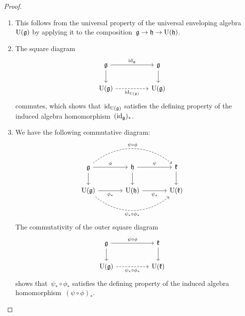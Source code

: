 \begin{proof}
  \leavevmode
  \begin{enumerate}
    \item
      This follows from the universal property of the universal enveloping algebra~$\operatorname{U}(\mathfrak{g})$ by applying it to the composition~$\mathfrak{g} \to \mathfrak{h} \to \operatorname{U}(\mathfrak{h})$.
    \item
      The square diagram
      \[
        \begin{tikzcd}[column sep = huge]
          \glie
          \arrow{r}[above]{\id_{\glie}}
          \arrow{d}
          &
          \glie
          \arrow{d}
          \\
          \Univ(\glie)
          \arrow[dashed]{r}[below]{\id_{\Univ(\glie)}}
          &
          \Univ(\glie)
        \end{tikzcd}
      \]
      commutes, which shows that~$\operatorname{id}_{\operatorname{U}(\mathfrak{g})}$ satisfies the defining property of the induced algebra homomorphism~$(\operatorname{id}_{\mathfrak{g}})_*$.
    \item
      We have the following commutative diagram:
      \[
        \begin{tikzcd}[column sep = large]
          \glie
          \arrow[dashed, bend left = 40]{rr}[above]{\psi \circ \phi}
          \arrow{r}[above]{\phi}
          \arrow{d}
          &
          \hlie
          \arrow{r}[above]{\psi}
          \arrow{d}
          &
          \klie
          \arrow{d}
          \\
          \Univ(\glie)
          \arrow{r}[below]{\phi_*}
          \arrow[dashed, bend right = 40]{rr}[below]{\psi_* \circ \phi_*}
          &
          \Univ(\hlie)
          \arrow{r}[below]{\psi_*}
          &
          \Univ(\klie)
        \end{tikzcd}
      \]
      The commutativity of the outer square diagram
      \[
        \begin{tikzcd}[column sep = huge]
          \glie
          \arrow{r}[above]{\psi \circ \phi}
          \arrow{d}
          &
          \klie
          \arrow{d}
          \\
          \Univ(\glie)
          \arrow[dashed]{r}[below]{\psi_* \circ \phi_*}
          &
          \Univ(\klie)
        \end{tikzcd}
      \]
      shows that~$\psi_* \circ \phi_*$ satisfies the defining property of the induced algebra homomorphism~$(\psi \circ \phi)_*$.
    \qedhere
  \end{enumerate}
\end{proof}


